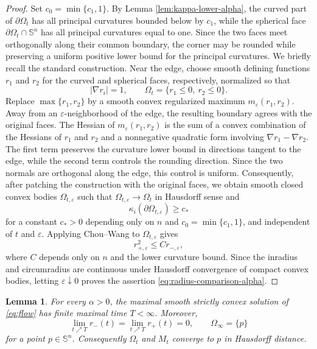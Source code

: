 \documentclass[11pt, reqno]{amsart}
\newtheorem{lemma}[theorem]{Lemma}
\theoremstyle{remark}
\theoremstyle{definition}
\numberwithin{equation}{section}
\newcommand{\Sph}{\mathbb S}
\begin{document}
\begin{proof}
Set $ c_0=\min\{c_1,1\}$.  By Lemma \ref{lem:kappa-lower-alpha}, the curved part of $\partial\Omega_t$ has all principal curvatures
bounded below by $c_1$, while the spherical face $\partial\Omega_t\cap\mathbb S^n$ has all principal
curvatures equal to one. Since the two faces meet orthogonally along their common
boundary, the corner may be rounded while preserving a uniform
positive lower bound for the principal curvatures. We briefly
recall the standard construction. Near the edge, choose smooth
defining functions $r_1$ and $r_2$ for the curved and spherical
faces, respectively, normalized so that
\begin{equation*}
    |\nabla r_i|=1,
    \qquad
    \Omega_t=\{r_1\leq0,\ r_2\leq0\}.
\end{equation*}
Replace $\max\{r_1,r_2\}$ by a smooth convex regularized maximum
$m_\varepsilon(r_1,r_2)$. Away from an $\varepsilon$-neighborhood
of the edge, the resulting boundary agrees with the original
faces. The Hessian of $m_\varepsilon(r_1,r_2)$ is the sum of a convex
combination of the Hessians of $r_1$ and $r_2$ and a
nonnegative quadratic form involving
$\nabla r_1-\nabla r_2$. The first term preserves the curvature
lower bound in directions tangent to the edge, while the second
term controls the rounding direction. Since the two normals are
orthogonal along the edge, this control is uniform. Consequently,
after patching the construction with the original faces, we
obtain smooth closed convex bodies $\Omega_{t,\varepsilon}$ such
that $ \Omega_{t,\varepsilon}\rightarrow\Omega_t$ in Hausdorff sense and 
\begin{equation*}
    \kappa_i(\partial\Omega_{t,\varepsilon})\geq c_*
\end{equation*}
for a constant $c_*>0$ depending only on $n$ and
$c_0=\min\{c_1,1\}$, and independent of $t$ and $\varepsilon$.  Applying Chou--Wang \cite[Lemma~2.2]{CW00} to
$\Omega_{t,\varepsilon}$ gives
\begin{equation*}
    r_{+,\varepsilon}^2\leq C r_{-,\varepsilon},
\end{equation*}
where $C$ depends only on $n$ and the lower curvature bound. Since the inradius and circumradius are continuous under
Hausdorff convergence of compact convex bodies, letting
$\varepsilon\downarrow0$ proves the assertion \eqref{eq:radius-comparison-alpha}.
\end{proof}

\begin{lemma}\label{prop:finite-extinction-alpha}
For every $\alpha>0$, the maximal smooth strictly convex solution of
\eqref{eq:flow} has finite maximal time $T<\infty$. Moreover,
\begin{equation*}
        \lim_{t\nearrow T}r_-(t)
        =\lim_{t\nearrow T}r_+(t)=0,
        \qquad \Omega_\infty=\{p\}
\end{equation*}
for a point $p\in\Sph^n$.  Consequently $\Omega_t$ and $M_t$ converge to $p$ in Hausdorff distance.
\end{lemma}
\end{document}
